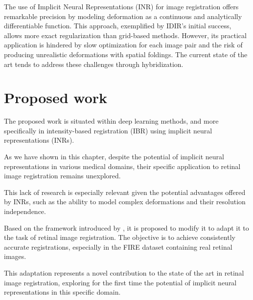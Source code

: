 The use of Implicit Neural Representations (INR) for image registration offers remarkable precision by modeling deformation as a continuous and analytically differentiable function. This approach, exemplified by IDIR's initial success, allows more exact regularization than grid-based methods. However, its practical application is hindered by slow optimization for each image pair and the risk of producing unrealistic deformations with spatial foldings. The current state of the art tends to address these challenges through hybridization.

\section{Proposed work}
\label{sec:Traballo proposto}

The proposed work is situated within deep learning methods, and more specifically in intensity-based registration (IBR) using implicit neural representations (INRs).

As we have shown in this chapter, despite the potential of implicit neural representations in various medical domains, their specific application to retinal image registration remains unexplored.

This lack of research is especially relevant given the potential advantages offered by INRs, such as the ability to model complex deformations and their resolution independence.

Based on the framework introduced by \cite{wolterink2021implicit}, it is proposed to modify it to adapt it to the task of retinal image registration. The objective is to achieve consistently accurate registrations, especially in the FIRE dataset containing real retinal images.

This adaptation represents a novel contribution to the state of the art in retinal image registration, exploring for the first time the potential of implicit neural representations in this specific domain.